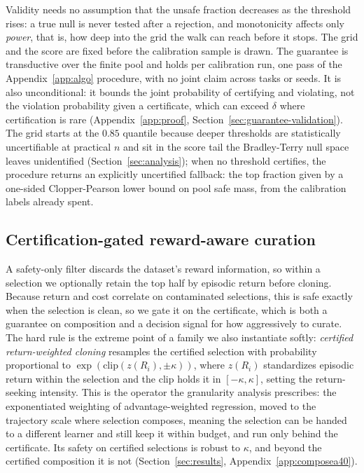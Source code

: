 \documentclass{article} %
\begin{document}
Validity needs no assumption that the unsafe fraction decreases as the threshold rises: a true null is never tested after a rejection, and monotonicity affects only \emph{power}, that is, how deep into the grid the walk can reach before it stops. The grid and the score are fixed before the calibration sample is drawn. The guarantee is transductive over the finite pool and holds per calibration run, one pass of the Appendix~\ref{app:algo}
procedure, with no joint claim across tasks or seeds. It is also unconditional: it bounds the joint probability of certifying and violating, not the violation probability given a certificate, which can exceed $\delta$ where certification is rare (Appendix~\ref{app:proof}, Section~\ref{sec:guarantee-validation}). The grid starts at the $0.85$ quantile because deeper thresholds are statistically uncertifiable at practical $n$ and sit in the score tail the Bradley-Terry null space leaves unidentified (Section~\ref{sec:analysis}); when no threshold certifies, the procedure returns an explicitly uncertified fallback: the top fraction given by a one-sided Clopper-Pearson lower bound on pool safe mass, from the calibration labels already spent.

\subsection{Certification-gated reward-aware curation}
\label{sec:gating}
A safety-only filter discards the dataset's reward information, so within a selection we optionally retain the top half by episodic return before cloning. Because return and cost correlate on contaminated selections, this is safe exactly when the selection is clean, so we gate it on the certificate, which is both a guarantee on composition and a decision signal for how aggressively to curate. The hard rule is the extreme point of a family we also instantiate softly: \emph{certified return-weighted cloning} resamples the certified selection with probability proportional to $\exp(\mathrm{clip}(z(R_i), \pm \kappa))$, where $z(R_i)$ standardizes episodic return within the selection and the clip holds it in $[-\kappa, \kappa]$, setting the return-seeking intensity. This is the operator the granularity analysis prescribes: the exponentiated weighting of advantage-weighted regression, moved to the trajectory scale where selection composes, meaning the selection can be handed to a different learner and still keep it within budget, and run only behind the certificate. Its safety on certified selections is robust to $\kappa$, and beyond the certified composition it is not (Section~\ref{sec:results}, Appendix~\ref{app:composea40}).
\end{document}
